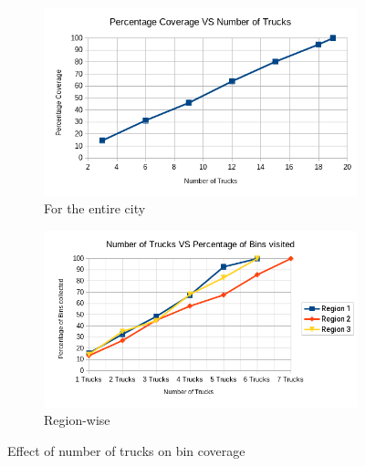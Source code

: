 \documentclass[12pt]{article}
\begin{document}


\begin{figure}[H]
    \centering
    \begin{subfigure}{0.5\textwidth}
        \centering
        \includegraphics[width=\linewidth]{coverage_VS_number_of_trucks.png}
        \caption{For the entire city}\label{figc1}
    \end{subfigure}%
    \begin{subfigure}{0.5\textwidth}
        \centering
        \includegraphics[width=\linewidth]{number_of_trucks_VS_bins_visited.png}
        \caption{Region-wise}\label{figc2}
    \end{subfigure}
    \caption{Effect of number of trucks on bin coverage}
    \label{fig3}
\end{figure}
\end{document}
